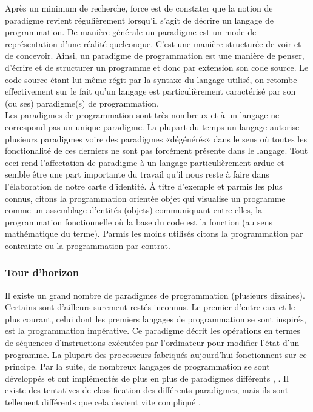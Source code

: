 Après un minimum de recherche, force est de constater que la notion de paradigme revient régulièrement lorsqu’il s’agit de décrire un langage de programmation.
De manière générale un paradigme est un mode de représentation d’une réalité quelconque. C’est une manière structurée de voir et de concevoir. Ainsi, un paradigme de programmation est une manière de penser, d’écrire et de structurer un programme et donc par extension son code source. Le code source étant lui-même régit par la syntaxe du langage utilisé, on retombe effectivement sur le fait qu’un langage est particulièrement caractérisé par son (ou ses) paradigme(s) de programmation.\\

Les paradigmes de programmation sont très nombreux et à un langage ne correspond pas un unique paradigme. La plupart du temps un langage autorise plusieurs paradigmes voire des paradigmes «dégénérés» dans le sens où toutes les fonctionalité de ces derniers ne sont pas forcément présente dans le langage. Tout ceci rend l’affectation de paradigme à un langage particulièrement ardue et semble être une part importante du travail qu’il nous reste à faire dans l’élaboration de notre carte d’identité.
À titre d’exemple et parmis les plus connus, citons la programmation orientée objet qui visualise un programme comme un assemblage d’entités (objets) communiquant entre elles, la programmation fonctionnelle où la base du code est la fonction (au sens mathématique du terme). Parmis les moins utilisés citons la programmation par contrainte ou la programmation par contrat.

\subsubsection{Tour d'horizon}

Il existe un grand nombre de paradigmes de programmation (plusieurs dizaines). Certains sont d'ailleurs surement restés inconnus. Le premier d'entre eux et le plus courant, celui dont les premiers langages de programmation se sont inspirés, est la programmation impérative. Ce paradigme décrit les opérations en termes de séquences d'instructions exécutées par l'ordinateur pour modifier l'état d'un programme. La plupart des processeurs fabriqués aujourd'hui fonctionnent sur ce principe. Par la suite, de nombreux langages de programmation se sont développés et ont implémentés de plus en plus de paradigmes différents \cite{bib_levenez}, \cite{bib_mandriva}. Il existe des tentatives de classification des différents paradigmes, mais ils sont tellement différents que cela devient vite compliqué \cite{bib_ucl}.\\

